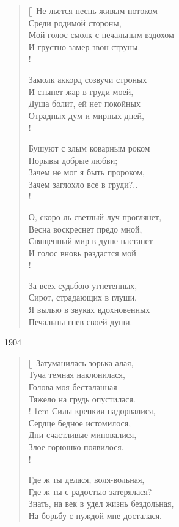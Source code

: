 \settowidth{\versewidth}{Мой голос смолк с печальным вздохом}
\begin{verse}[\versewidth]
Не льется песнь живым потоком\\
Среди родимой стороны,\\
Мой голос смолк с печальным вздохом\\
И грустно замер звон струны.\\!

Замолк аккорд созвучи строных\\
И стынет жар в груди моей,\\
Душа болит, ей нет покойных\\
Отрадных дум и мирных дней,\\!

Бушуют с злым коварным роком\\
Порывы добрые любви;\\
Зачем не мог я быть пророком,\\
Зачем заглохло все в груди?..\\!

О, скоро ль светлый луч проглянет,\\
Весна воскреснет предо мной,\\
Священный мир в душе настанет\\
И голос вновь раздастся мой\\!

За всех судьбою угнетенных,\\
Сирот, страдающих в глуши,\\
Я вылью в звуках вдохновенных\\
Печальны гнев своей души.

\end{verse}
1904

\settowidth{\versewidth}{\vinДни счастливые миновалися,}
\begin{verse}[\versewidth]
Затуманилась зорька алая,\\
Туча темная наклонилася,\\
Голова моя бесталанная\\
Тяжело на грудь опустилася.\\!
\begingroup
\leftskip1em
\rightskip\leftskip
    Силы крепкия  надорвалися,\\
    Сердце бедное истомилося,\\
    Дни счастливые миновалися,\\
    Злое горюшко появилося.\\!
\endgroup

Где ж ты делася, воля-вольная,\\
Где ж ты с радостью затерялася?\\
Знать, на век в удел жизнь бездольная,\\
На борьбу с нуждой мне досталася.
\end{verse}

